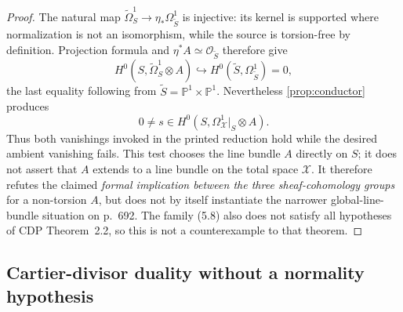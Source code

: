 \begin{proof}
The natural map
$\widetilde\Omega^1_S\to\eta_*\Omega^1_{\widetilde S}$ is injective:
its kernel is supported where normalization is not an isomorphism, while
the source is torsion-free by definition.  Projection formula and
$\eta^*A\simeq\mathcal O_{\widetilde S}$ therefore give
\[
H^0(S,\widetilde\Omega^1_S\otimes A)
\hookrightarrow
H^0(\widetilde S,\Omega^1_{\widetilde S})=0,
\tag{5.10}
\]
the last equality following from
$\widetilde S=\mathbb P^1\times\mathbb P^1$.
Nevertheless \cref{prop:conductor} produces
\[
0\ne s\in H^0(S,\Omega^1_{\mathcal X}|_S\otimes A).
\]
Thus both vanishings invoked in the printed reduction hold while the desired
ambient vanishing fails.  This test chooses the line bundle $A$ directly on
$S$; it does not assert that $A$ extends to a line bundle on the total space
$\mathcal X$.  It therefore refutes the claimed \emph{formal implication
between the three sheaf-cohomology groups} for a non-torsion $A$, but does
not by itself instantiate the narrower global-line-bundle situation on
p.~692.  The family (5.8) also does not satisfy all hypotheses of CDP
Theorem~2.2, so this is not a counterexample to that theorem.
\end{proof}

\subsection{Cartier-divisor duality without a normality hypothesis}

